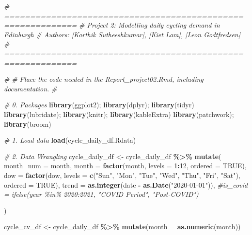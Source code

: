 \documentclass[
]{article}
\newenvironment{Shaded}{\begin{snugshade}}{\end{snugshade}}
\newcommand{\AttributeTok}[1]{\textcolor[rgb]{0.13,0.29,0.53}{#1}}
\newcommand{\CommentTok}[1]{\textcolor[rgb]{0.56,0.35,0.01}{\textit{#1}}}
\newcommand{\ConstantTok}[1]{\textcolor[rgb]{0.56,0.35,0.01}{#1}}
\newcommand{\DecValTok}[1]{\textcolor[rgb]{0.00,0.00,0.81}{#1}}
\newcommand{\FunctionTok}[1]{\textcolor[rgb]{0.13,0.29,0.53}{\textbf{#1}}}
\newcommand{\NormalTok}[1]{#1}
\newcommand{\OtherTok}[1]{\textcolor[rgb]{0.56,0.35,0.01}{#1}}
\newcommand{\SpecialCharTok}[1]{\textcolor[rgb]{0.81,0.36,0.00}{\textbf{#1}}}
\newcommand{\StringTok}[1]{\textcolor[rgb]{0.31,0.60,0.02}{#1}}
\begin{document}
\begin{Shaded}
\begin{Highlighting}[]
\CommentTok{\# ============================================================}
\CommentTok{\# Project 2: Modelling daily cycling demand in Edinburgh}
\CommentTok{\# Authors: [Karthik Sutheeshkumar], [Kiet Lam], [Leon Godtfredsen]}
\CommentTok{\# ============================================================}

\CommentTok{\#}
\CommentTok{\# Place the code needed in the Report\_project02.Rmd, including documentation.}
\CommentTok{\#}

\CommentTok{\# 0. Packages}
\FunctionTok{library}\NormalTok{(ggplot2); }\FunctionTok{library}\NormalTok{(dplyr); }\FunctionTok{library}\NormalTok{(tidyr)}
\FunctionTok{library}\NormalTok{(lubridate); }\FunctionTok{library}\NormalTok{(knitr); }\FunctionTok{library}\NormalTok{(kableExtra)}
\FunctionTok{library}\NormalTok{(patchwork); }\FunctionTok{library}\NormalTok{(broom)}

\CommentTok{\# 1. Load data}
\FunctionTok{load}\NormalTok{(}\StringTok{\textquotesingle{}cycle\_daily\_df.Rdata\textquotesingle{}}\NormalTok{)}

\CommentTok{\# 2. Data Wrangling }
\NormalTok{cycle\_daily\_df }\OtherTok{\textless{}{-}}\NormalTok{ cycle\_daily\_df }\SpecialCharTok{\%\textgreater{}\%}
  \FunctionTok{mutate}\NormalTok{(}
    \AttributeTok{month\_num =}\NormalTok{ month,}
    \AttributeTok{month =} \FunctionTok{factor}\NormalTok{(month, }\AttributeTok{levels =} \DecValTok{1}\SpecialCharTok{:}\DecValTok{12}\NormalTok{, }\AttributeTok{ordered =} \ConstantTok{TRUE}\NormalTok{),}
    \AttributeTok{dow =} \FunctionTok{factor}\NormalTok{(dow, }\AttributeTok{levels =} \FunctionTok{c}\NormalTok{(}\StringTok{"Sun"}\NormalTok{, }\StringTok{"Mon"}\NormalTok{, }\StringTok{"Tue"}\NormalTok{, }\StringTok{"Wed"}\NormalTok{, }\StringTok{"Thu"}\NormalTok{, }\StringTok{"Fri"}\NormalTok{, }\StringTok{"Sat"}\NormalTok{),}
                 \AttributeTok{ordered =} \ConstantTok{TRUE}\NormalTok{),}
    \AttributeTok{trend =} \FunctionTok{as.integer}\NormalTok{(date }\SpecialCharTok{{-}} \FunctionTok{as.Date}\NormalTok{(}\StringTok{"2020{-}01{-}01"}\NormalTok{)),}
    \CommentTok{\#is\_covid = ifelse(year \%in\% 2020:2021, "COVID Period", "Post{-}COVID")}
    
\NormalTok{  )}

\NormalTok{cycle\_cv\_df }\OtherTok{\textless{}{-}}\NormalTok{ cycle\_daily\_df }\SpecialCharTok{\%\textgreater{}\%}
  \FunctionTok{mutate}\NormalTok{(}\AttributeTok{month =} \FunctionTok{as.numeric}\NormalTok{(month))}


\end{Highlighting}
\end{Shaded}
\end{document}
